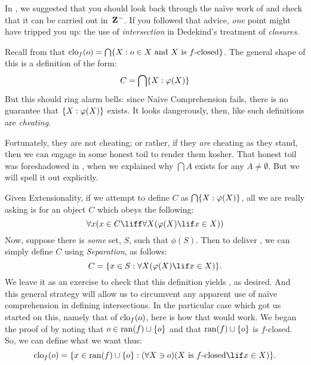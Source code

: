 \documentclass[../../../include/open-logic-section]{subfiles}
\begin{document}

In , we suggested that you should look
back through the na\"ive work of  and check that
it can be carried out in~$\mathbf{Z}^{-}$. If you followed that advice,
\emph{one} point might have tripped you up: the use of
\emph{intersection} in Dedekind's treatment of \emph{closures}. 

Recall from  that
$\mathrm{clo}_{f}(o) = \bigcap\{ X : o \in X \text{ and $X$ is
$f$-closed} \}$. The general shape of this is a definition of the form:
\[
	C = \bigcap\{ X : \varphi(X) \}
\]
But this should ring alarm bells: since Na\"ive Comprehension fails,
there is no guarantee that $\{ X : \varphi(X) \}$ exists. It looks
dangerously, then, like such definitions are \emph{cheating}. 

Fortunately, they are not cheating; or rather, if they \emph{are}
cheating as they stand, then we can engage in some honest toil to
render them kosher. That honest toil was foreshadowed in
, when we explained why
$\bigcap A$ exists for any $A \neq \emptyset$. But we will spell it out
explicitly.

Given Extensionality, if we attempt to define $C$ as
$\bigcap\{ X : \varphi(X) \}$, all we are really asking is for an
object $C$ which obeys the following:
\begin{equation}\ollabel{bicondelimarbintersection}
	\forall x(x \in C \liff \forall X(\phi(X) \lif x \in X))
\end{equation}
Now, suppose there is \emph{some} set, $S$, such that $\phi(S)$. Then
to deliver , we can simply define $C$
using \emph{Separation}, as follows:
\[
	C = \Setabs{x \in S}{\forall X(\phi(X) \lif x \in X)}.
\]
We leave it as an exercise to check that this definition yields
, as desired. 
And this general strategy will allow us to circumvent any apparent use
of na\"ive comprehension in defining intersections. In the particular
case which got us started on this, namely that of
$\mathrm{clo}_{f}(o)$, here is how that would work. We began the
proof of  by noting
that $o \in \mathrm{ran}(f)\cup\{o\}$ and that $\mathrm{ran}(f) \cup \{o\}$ is
$f$-closed. So, we can define what we want thus:
\[
	\closureofunder{f}{o} = \Setabs{x \in \ran{f} \cup \{o\}}{(\forall X \ni o)(X \text{ is $f$-closed} \lif x \in X)}.
\]
\end{document}
